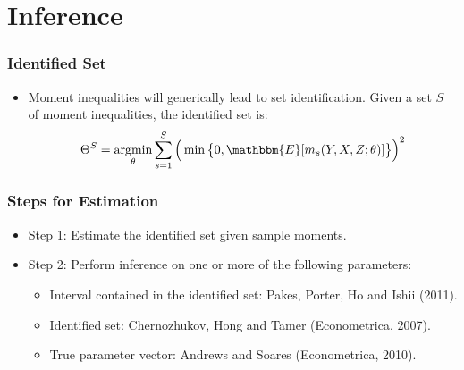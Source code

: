 
\section{Inference}


\begin{frame}
\frametitle{Identified Set}

\begin{itemize}
\item Moment inequalities will generically lead to set identification. Given
a set $S$ of moment inequalities, the identified set is:  
\begin{equation*}
\Theta^{S}=\operatornamewithlimits{argmin}_{\theta}\sum_{s=1}^{S}\Big(\min%
\big\{0,\mathbbm{E}[m_{s}(Y,X,Z;\theta)]\big\}\Big)^{2}
\end{equation*}
\begin{figure}[h!]
\begin{center}
   
\end{center}
\end{figure}
\end{itemize}
\end{frame}


\begin{frame}
\frametitle{Steps for Estimation}

\begin{itemize}
\item Step 1: Estimate the identified set given sample moments. 

\item Step 2: Perform inference on one or more of the following parameters: 

\begin{itemize}
\item Interval contained in the identified set: Pakes, Porter, Ho and Ishii
(2011). 

\item Identified set: Chernozhukov, Hong and Tamer (Econometrica, 2007). 

\item True parameter vector: Andrews and Soares (Econometrica, 2010). 
\end{itemize}
\end{itemize}
\end{frame}


